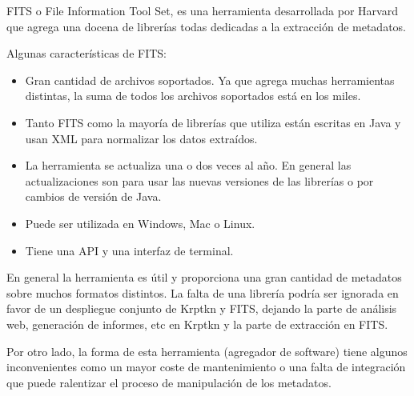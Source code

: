 FITS o File Information Tool Set, es una herramienta desarrollada por Harvard que agrega una docena de librerías todas dedicadas a la extracción de metadatos.

Algunas características de FITS:

\begin{itemize}
  \item Gran cantidad de archivos soportados. Ya que agrega muchas herramientas distintas, la suma de todos los archivos soportados está en los miles.
  \item Tanto FITS como la mayoría de librerías que utiliza están escritas en Java y usan XML para normalizar los datos extraídos.
  \item La herramienta se actualiza una o dos veces al año. En general las actualizaciones son para usar las nuevas versiones de las librerías o por cambios de versión de Java.
  \item Puede ser utilizada en Windows, Mac o Linux.
  \item Tiene una API y una interfaz de terminal.
\end{itemize}

En general la herramienta es útil y proporciona una gran cantidad de metadatos sobre muchos formatos distintos. La falta de una librería podría ser ignorada en favor de un despliegue conjunto de Krptkn y FITS, dejando la parte de análisis web, generación de informes, etc en Krptkn y la parte de extracción en FITS.

Por otro lado, la forma de esta herramienta (agregador de software) tiene algunos inconvenientes como un mayor coste de mantenimiento o una falta de integración que puede ralentizar el proceso de manipulación de los metadatos.